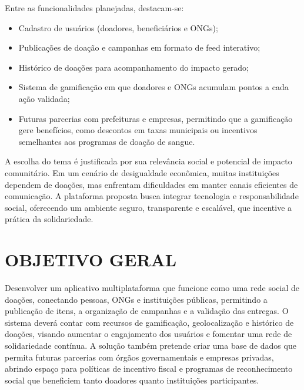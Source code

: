\documentclass[%
  article,%
  a4paper,%
  12pt,%
  fleqn,%
  oneside,%
  chapter = TITLE,%
  section = TITLE,%
]{abntex2}
\begin{document}
Entre as funcionalidades planejadas, destacam-se:
\begin{itemize}
    \item Cadastro de usuários (doadores, beneficiários e ONGs);
    \item Publicações de doação e campanhas em formato de feed interativo;
    \item Histórico de doações para acompanhamento do impacto gerado;
    \item Sistema de gamificação em que doadores e ONGs acumulam pontos a cada ação validada;
    \item Futuras parcerias com prefeituras e empresas, permitindo que a gamificação gere benefícios, como descontos em taxas municipais ou incentivos semelhantes aos programas de doação de sangue.
\end{itemize}

A escolha do tema é justificada por sua relevância social e potencial de impacto comunitário. Em um cenário de desigualdade econômica, muitas instituições dependem de doações, mas enfrentam dificuldades em manter canais eficientes de comunicação. A plataforma proposta busca integrar tecnologia e responsabilidade social, oferecendo um ambiente seguro, transparente e escalável, que incentive a prática da solidariedade.

\section{OBJETIVO GERAL}

Desenvolver um aplicativo multiplataforma que funcione como uma rede social de doações, conectando pessoas, ONGs e instituições públicas, permitindo a publicação de itens, a organização de campanhas e a validação das entregas. O sistema deverá contar com recursos de gamificação, geolocalização e histórico de doações, visando aumentar o engajamento dos usuários e fomentar uma rede de solidariedade contínua. A solução também pretende criar uma base de dados que permita futuras parcerias com órgãos governamentais e empresas privadas, abrindo espaço para políticas de incentivo fiscal e programas de reconhecimento social que beneficiem tanto doadores quanto instituições participantes.

\postextual%
\newpage
\printbibliography%

\end{document}
